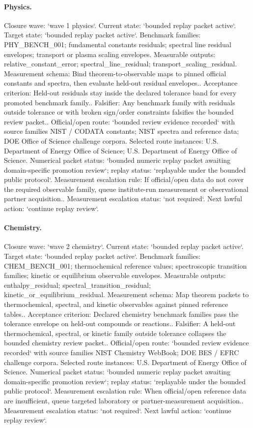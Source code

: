 \paragraph{Physics.}
Closure wave: `wave 1 physics`. Current state: `bounded replay packet active`. Target state: `bounded replay packet active`.
Benchmark families: PHY\_BENCH\_001; fundamental constants residuals; spectral line residual envelopes; transport or plasma scaling envelopes.
Measurable outputs: relative\_constant\_error; spectral\_line\_residual; transport\_scaling\_residual.
Measurement schema: Bind theorem-to-observable maps to pinned official constants and spectra, then evaluate held-out residual envelopes..
Acceptance criterion: Held-out residuals stay inside the declared tolerance band for every promoted benchmark family..
Falsifier: Any benchmark family with residuals outside tolerance or with broken sign/order constraints falsifies the bounded review packet..
Official/open route: `bounded review evidence recorded` with source families NIST / CODATA constants; NIST spectra and reference data; DOE Office of Science challenge corpora.
Selected route instances: U.S. Department of Energy Office of Science; U.S. Department of Energy Office of Science.
Numerical packet status: `bounded numeric replay packet awaiting domain-specific promotion review`; replay status: `replayable under the bounded public protocol`.
Measurement escalation rule: If official/open data do not cover the required observable family, queue institute-run measurement or observational partner acquisition..
Measurement escalation status: `not required`.
Next lawful action: `continue replay review`.

\paragraph{Chemistry.}
Closure wave: `wave 2 chemistry`. Current state: `bounded replay packet active`. Target state: `bounded replay packet active`.
Benchmark families: CHEM\_BENCH\_001; thermochemical reference values; spectroscopic transition families; kinetic or equilibrium observable envelopes.
Measurable outputs: enthalpy\_residual; spectral\_transition\_residual; kinetic\_or\_equilibrium\_residual.
Measurement schema: Map theorem packets to thermochemical, spectral, and kinetic observables against pinned reference tables..
Acceptance criterion: Declared chemistry benchmark families pass the tolerance envelope on held-out compounds or reactions..
Falsifier: A held-out thermochemical, spectral, or kinetic family outside tolerance collapses the bounded chemistry review packet..
Official/open route: `bounded review evidence recorded` with source families NIST Chemistry WebBook; DOE BES / EFRC challenge corpora.
Selected route instances: U.S. Department of Energy Office of Science.
Numerical packet status: `bounded numeric replay packet awaiting domain-specific promotion review`; replay status: `replayable under the bounded public protocol`.
Measurement escalation rule: When official/open reference data are insufficient, queue targeted laboratory or partner-measurement acquisition..
Measurement escalation status: `not required`.
Next lawful action: `continue replay review`.

